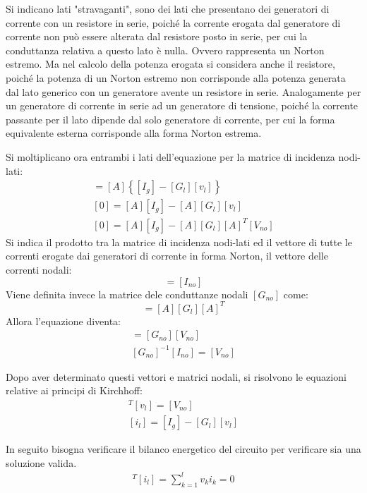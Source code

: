 \documentclass{article}
\numberwithin{equation}{subsection}
\begin{document}
Si indicano lati "stravaganti", sono dei lati che presentano dei generatori di corrente con un resistore in serie, poiché la corrente erogata dal generatore di corrente non può 
essere alterata dal resistore posto in serie, per cui la conduttanza relativa a questo lato è nulla. Ovvero rappresenta un Norton estremo. Ma nel calcolo della potenza 
erogata si considera anche il resistore, poiché la potenza di un Norton estremo non corrisponde alla potenza generata dal lato generico con un generatore avente un resistore in 
serie. 
Analogamente per un generatore di corrente in serie ad un generatore di tensione, poiché la corrente passante per il lato dipende dal solo generatore di corrente, per cui la 
forma equivalente esterna corrisponde alla forma Norton estrema. 

Si moltiplicano ora entrambi i lati dell'equazione per la matrice di incidenza nodi-lati:
\begin{gather*}
    [A][i_l]=[A]\left\{[I_g]-[G_l][v_l]\right\}\\
    [0]=[A][I_g]-[A][G_l][v_l]\\
    [0]=[A][I_g]-[A][G_l][A]^T[V_{no}]
\end{gather*}
Si indica il prodotto tra la matrice di incidenza nodi-lati ed il vettore di tutte le correnti erogate dai generatori di corrente in forma Norton, il vettore delle correnti 
nodali:
\begin{equation*}
    [A][I_g]=[I_{no}]
\end{equation*}
Viene definita invece la matrice dele conduttanze nodali $[G_{no}]$ come:
\begin{equation*}
    [G_{no}]=[A][G_l][A]^T
\end{equation*}
Allora l'equazione diventa:
\begin{gather*}
    [I_{no}]=[G_{no}][V_{no}]\\
    [G_{no}]^{-1}[I_{no}]=[V_{no}]
\end{gather*}

Dopo aver determinato questi vettori e matrici nodali, si risolvono le equazioni relative ai principi di Kirchhoff: 
\begin{gather*}
    [A]^T[v_l]=[V_{no}]\\
    [i_l]=[I_g]-[G_l][v_l]
\end{gather*}

In seguito bisogna verificare il bilanco energetico del circuito per verificare sia una soluzione valida. 
\begin{gather*}
    [v_l]^T[i_l]=\displaystyle\sum_{k=1}^lv_ki_k=0
\end{gather*}
\end{document}
